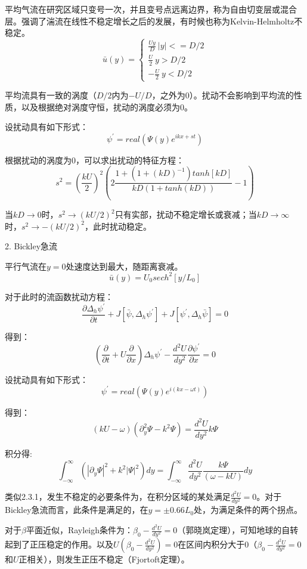 \documentclass{article}
\begin{document}
平均气流在研究区域只变号一次，并且变号点远离边界，称为自由切变层或混合层。强调了湍流在线性不稳定增长之后的发展，有时候也称为Kelvin-Helmholtz不稳定。
$$\bar{u}(y)=\begin{cases}
\frac{Uy}{D} \    |y| <= D/2 \\
\frac{U}{2}  \   y > D/2 \\
-\frac{U}{2} \    y < D/2
\end{cases}$$

平均流具有一致的涡度（$D/2$内为$-U/D$，之外为$0$）。扰动不会影响到平均流的性质，以及根据绝对涡度守恒，扰动的涡度必须为$0$。

设扰动具有如下形式：
$$\psi^{\prime}=real\left(\Psi(y)e^{ikx+st}\right)$$

根据扰动的涡度为$0$，可以求出扰动的特征方程：
$$s^2=\left(\frac{kU}{2}\right)^2\left(2\frac{1+(1+(kD)^{-1})tanh[kD]}{kD(1+tanh(kD))}-1\right)$$

当$kD\rightarrow0$时，$s^2\rightarrow(kU/2)^2$只有实部，扰动不稳定增长或衰减；当$kD \rightarrow \infty$时，$s^2 \rightarrow -(kU/2)^2$，此时扰动稳定。

2. Bickley急流

平行气流在$y=0$处速度达到最大，随距离衰减。
$$\bar{u}(y) = U_0sech^2[y/L_0]$$

对于此时的流函数扰动方程：
$$\frac{\partial\Delta_h\psi^{\prime}}{\partial t} + J[\bar{\psi}, \Delta_h\psi^{\prime}] +J[\psi^{\prime}, \Delta_h\bar{\psi}] = 0$$

得到：
$$(\frac{\partial}{\partial t}+U\frac{\partial}{\partial x})\Delta_h\psi^{\prime}-\frac{d^2U}{dy^2}\frac{\partial\psi^{\prime}}{\partial x} = 0$$

设扰动具有如下形式：
$$\psi^{\prime}=real\left(\Psi(y)e^{i(kx-\omega t)}\right)$$

得到：
$$(kU-\omega)(\partial_y^2\Psi-k^2\Psi)=\frac{d^2U}{dy^2}k\Psi$$

积分得:
$$\int_{-\infty}^{\infty}(|\partial_y\Psi|^2+k^2|\Psi|^2)dy=\int_{-\infty}^{\infty}\frac{d^2U}{dy^2}\frac{k\Psi}{(\omega-kU)} dy$$

类似2.3.1，发生不稳定的必要条件为，在积分区域的某处满足$\frac{d^2U}{dy^2}=0$。对于Bickley急流而言，此条件是满足的，在$y= \pm 0.66L_0$处，为满足条件的两个拐点。

对于$\beta$平面近似，Rayleigh条件为：$\beta_0-\frac{d^2U}{dy^2}=0$（郭晓岚定理），可知地球的自转起到了正压稳定的作用。以及$U(\beta_0-\frac{d^2U}{dy^2})=0$在区间内积分大于0（$\beta_0-\frac{d^2U}{dy^2}=0$和$U$正相关），则发生正压不稳定（Fjortoft定理）。
\end{document}
